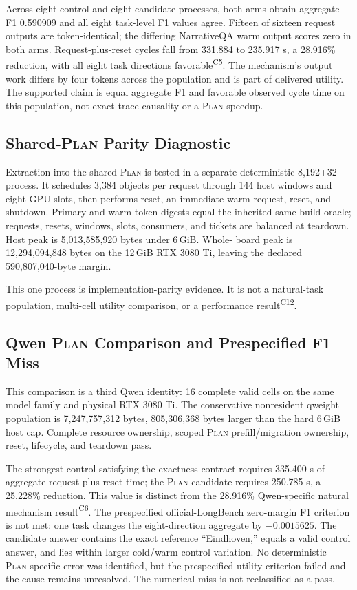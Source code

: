 \documentclass[letterpaper,twocolumn,10pt]{article}
\newcommand{\Plan}{\textsc{Plan}\xspace}
\newcommand{\GiB}{\,GiB\xspace}
\newcommand{\claimref}[1]{\hyperlink{claim:#1}{\textsuperscript{\textsf{#1}}}}
\begin{document}
{Across eight control and eight candidate processes, both arms obtain aggregate
F1 0.590909 and all eight task-level F1 values agree.  Fifteen of sixteen
request outputs are token-identical; the differing NarrativeQA warm output
scores zero in both arms.  Request-plus-reset cycles fall from 331.884 to
235.917 s, a 28.916\% reduction, with all eight task directions
favorable\claimref{C5}.  The
mechanism's output work differs by four tokens across the population and is
part of delivered utility.  The supported claim is equal aggregate F1 and
favorable observed cycle time on this population, not exact-trace causality or
a \Plan speedup.

\subsection{Shared-\Plan Parity Diagnostic}
\label{sec:qwenparity}

Extraction into the shared \Plan is tested in a separate deterministic
8,192+32 process.  It schedules 3,384 objects per request through 144 host
windows and eight GPU slots, then performs reset, an immediate-warm request,
reset, and shutdown.  Primary and warm token digests equal the inherited
same-build oracle; requests, resets, windows, slots, consumers, and tickets are
balanced at teardown.  Host peak is 5,013,585,920 bytes under 6\GiB.  Whole-
board peak is 12,294,094,848 bytes on the 12\GiB RTX 3080 Ti, leaving the
declared 590,807,040-byte margin.

This one process is implementation-parity evidence.  It is not a natural-task
population, multi-cell utility comparison, or a performance
result\claimref{C12}.

\subsection{Qwen \Plan Comparison and Prespecified F1 Miss}
\label{sec:qwencomparison}

This comparison is a third Qwen identity: 16 complete valid cells on the
same model family and physical RTX 3080 Ti.  The conservative nonresident
qweight population is 7,247,757,312 bytes, 805,306,368 bytes larger than the
hard 6\GiB host cap.  Complete resource ownership, scoped \Plan
prefill/migration ownership, reset, lifecycle, and teardown pass.

The strongest control satisfying the exactness contract requires 335.400 s of aggregate
request-plus-reset time; the \Plan candidate requires 250.785 s, a 25.228\%
reduction.  This value is distinct from the 28.916\% Qwen-specific natural
mechanism result\claimref{C6}.  The prespecified official-LongBench zero-margin F1 criterion
is not met: one task changes the eight-direction aggregate by $-0.0015625$.  The
candidate answer contains the exact reference ``Eindhoven,'' equals a valid
control answer, and lies within larger cold/warm control variation.  No
deterministic \Plan-specific error was identified, but the prespecified utility
criterion failed and the cause remains unresolved.  The numerical miss is not
reclassified as a pass.

}
\end{document}
